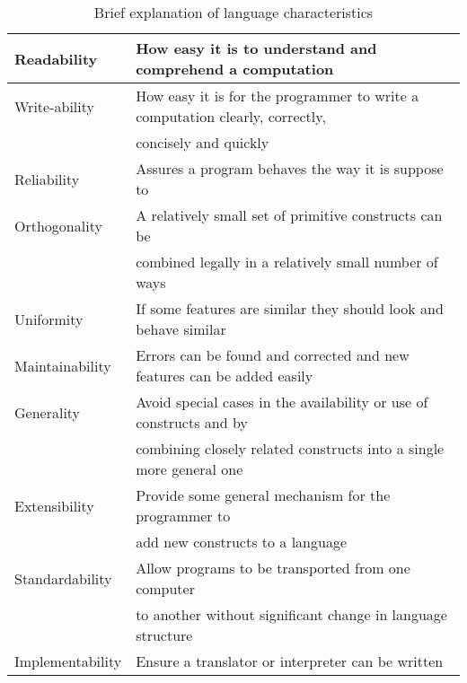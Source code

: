 \begin{table}
	\begin{tabular}{|l|l|}
		\hline
		Readability & How easy it is to understand and comprehend a computation \\ \hline
		Write-ability & How easy it is for the programmer to write a computation clearly, correctly, \\
		~ & concisely and quickly \\ \hline
		Reliability & Assures a program behaves the way it is suppose to \\ \hline
		Orthogonality & A relatively small set of primitive constructs can be \\
		~ & combined legally in a relatively small number of ways \\ \hline		
		Uniformity & If some features are similar they should look and behave similar \\ \hline
		Maintainability & Errors can be found and corrected and new features can be added easily \\ \hline
		Generality & Avoid special cases in the availability or use of constructs and by \\ 
		~ & combining closely related constructs into a single more general one \\ \hline
		Extensibility & Provide some general mechanism for the programmer to \\
		~ & add new constructs to a language \\ \hline
		Standardability & Allow programs to be transported from one computer \\
		~ & to another without significant change in language structure \\ \hline
		Implementability & Ensure a translator or interpreter can be written \\
		\hline
	\end{tabular}
	\label{tab:langCharacteristics}
	\caption{Brief explanation of language characteristics \citep{sebesta}}
\end{table}


